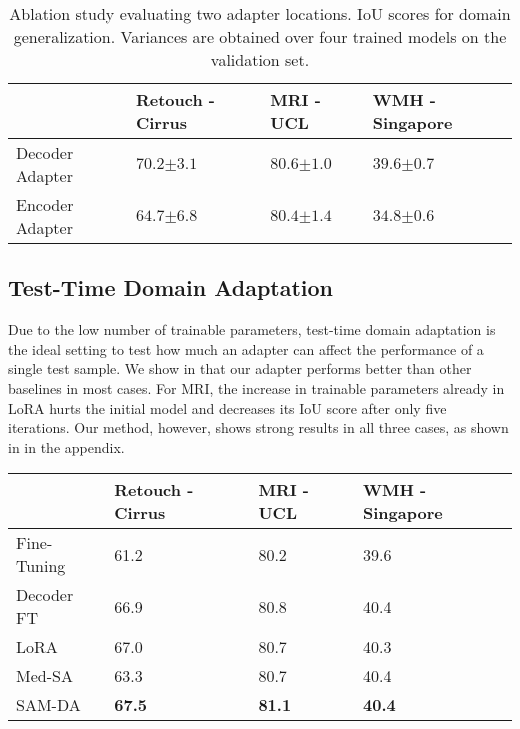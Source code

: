 \begin{table*}[]
\caption{Ablation study evaluating two adapter locations. IoU scores for domain generalization. Variances are obtained over four trained models on the validation set.}
\label{tab:encoder_ablation_generalization}
\centering
\begin{tabular}{@{}lP{2.8cm}P{2.5cm}P{3.2cm}@{}}
\toprule
 & Retouch - Cirrus & MRI - UCL & WMH - Singapore  \\ \midrule
Decoder Adapter & $\mathbf{70.2}{\scriptscriptstyle \pm 3.1}$ & $\mathbf{80.6}{\scriptscriptstyle \pm 1.0}$ & $\mathbf{39.6}{\scriptscriptstyle \pm 0.7}$ \\
Encoder Adapter & $64.7{\scriptscriptstyle \pm 6.8}$ & $80.4{\scriptscriptstyle \pm 1.4}$ & $34.8{\scriptscriptstyle \pm 0.6}$ \\ \bottomrule

\end{tabular}
\end{table*}

\subsection{Test-Time Domain Adaptation}
Due to the low number of trainable parameters, test-time domain adaptation is the ideal setting to test how much an adapter can affect the performance of a single test sample. We show in  that our adapter performs better than other baselines in most cases. For MRI, the increase in trainable parameters already in LoRA hurts the initial model and decreases its IoU score after only five iterations. Our method, however, shows strong results in all three cases, as shown in  in the appendix.


\begin{table}[]
\centering
\begin{tabular}{@{}lP{2.5cm}P{2.5cm}P{3cm}@{}}
\toprule
 & Retouch - Cirrus & MRI - UCL & WMH - Singapore \\ \midrule
Fine-Tuning & 61.2 & 80.2 & 39.6 \\
Decoder FT & 66.9 & 80.8 & 40.4 \\
LoRA~\cite{hu2022lora} & 67.0 & 80.7 & 40.3 \\
Med-SA~\cite{wu2023medical} & 63.3 & 80.7 & 40.4 \\ \midrule
SAM-DA & \textbf{67.5} & \textbf{81.1} & \textbf{40.4} \\ \bottomrule
\end{tabular}
\end{table}


